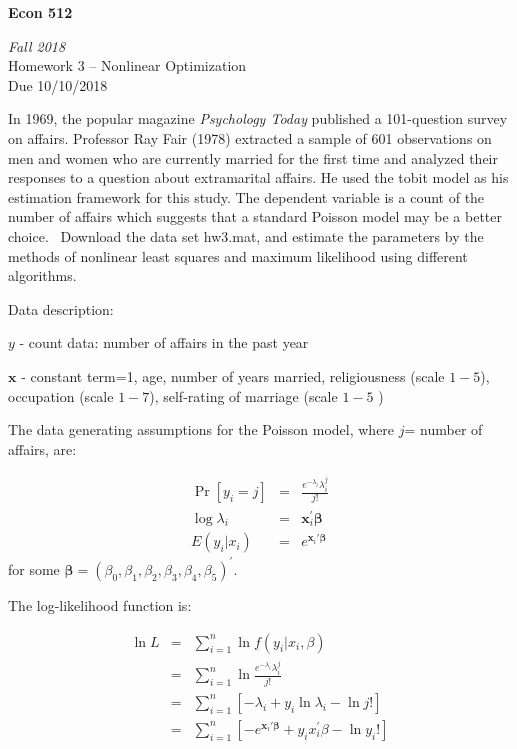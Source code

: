 \documentclass{article}
\begin{document}
\begin{center}
\textbf{Econ 512}

\emph{Fall 2018}\\[1em]

Homework 3 -- Nonlinear Optimization \\
Due 10/10/2018
\\[3em]
\end{center}

\bigskip


In 1969, the popular magazine \textit{Psychology Today }published a
101-question survey on affairs. Professor Ray Fair (1978) extracted a sample
of 601 observations on men and women who are currently married for the first
time and analyzed their responses to a question about extramarital affairs.
He used the tobit model as his estimation framework for this study. The
dependent variable is a count of the number of affairs which suggests that a
standard Poisson model may be a better choice. \ Download the data set
hw3.mat, and estimate the parameters by the methods of nonlinear least
squares and maximum likelihood using different algorithms.

Data description:

$y$ - count data: number of affairs in the past year

$\mathbf{x}$ - constant term=1, age, number of years married, religiousness
(scale $1-5$), occupation (scale $1-7$), self-rating of marriage (scale $1-5$%
)

\bigskip

The data generating assumptions for the Poisson model, where $j$= number of
affairs, are:\bigskip

\begin{eqnarray*}
\Pr \left[ y_{i}=j\right] &=&\frac{e^{-\lambda _{i}}\lambda _{i}^{j}}{j!} \\
\log \lambda _{i} &=&\mathbf{x}_{i}^{\prime }\mathbf{\beta } \\
E\left( y_{i}\left\vert x_{i}\right. \right) &=&e^{\mathbf{x}_{i}\prime 
\mathbf{\beta }}
\end{eqnarray*}%
for some $\mathbf{\beta }=\left( \beta _{0},\beta _{1},\beta _{2},\beta
_{3},\beta _{4},\beta _{5}\right) ^{\prime }.$

\bigskip

The log-likelihood function is:

\begin{eqnarray*}
\ln L &=&\sum\limits_{i=1}^{n}\ln f\left( y_{i}\left\vert x_{i}\right.
,\beta \right) \\
&=&\sum\limits_{i=1}^{n}\ln \frac{e^{-\lambda _{i}}\lambda _{i}^{j}}{j!} \\
&=&\sum\limits_{i=1}^{n}\left[ -\lambda _{i}+y_{i}\ln \lambda _{i}-\ln j!%
\right] \\
&=&\sum\limits_{i=1}^{n}\left[ -e^{\mathbf{x}_{i}\prime \mathbf{\beta }%
}+y_{i}x_{i}^{\prime }\beta -\ln y_{i}!\right]
\end{eqnarray*}
\end{document}

